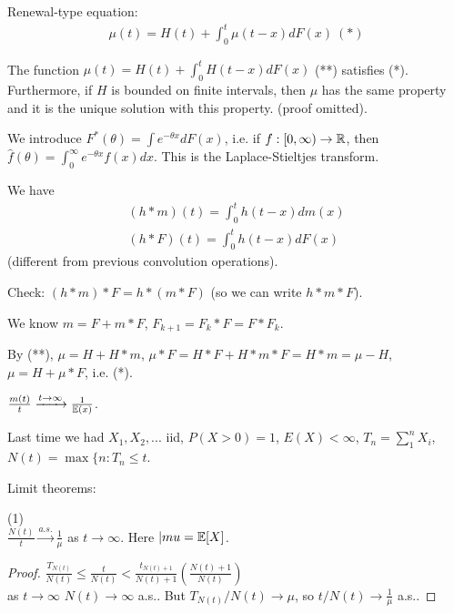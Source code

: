 \documentclass[a4paper]{article}
\begin{document}
Renewal-type equation:
\begin{equation*}
\begin{aligned}
\mu(t) = H(t) +\int_0^t \mu(t-x) dF(x) \ (*)
\end{aligned}
\end{equation*}

\begin{thm}
The function $\mu(t) = H(t) + \int_0^t H(t-x) dF(x)$ (**) satisfies (*). Furthermore, if $H$ is bounded on finite intervals, then $\mu$ has the same property and it is the unique solution with this property. (proof omitted).
\end{thm}

We introduce $F^*(\theta) = \int e^{-\theta x} dF(x)$, i.e. if $f:[0,\infty) \to \mathbb{R}$, then $\hat{f}(\theta) = \int_0^\infty e^{-\theta x} f(x) dx$. This is the Laplace-Stieltjes transform.

We have
\begin{equation*}
\begin{aligned}
(h*m) (t) = \int_0^t h(t-x) dm(x)\\
(h*F) (t) = \int_0^t h(t-x) dF(x)
\end{aligned}
\end{equation*}
(different from previous convolution operations).

Check: $(h*m)*F = h*(m*F)$ (so we can write $h*m*F$).

We know $m = F+m*F$, $F_{k+1} = F_k * F = F*F_k$.

By (**), $\mu = H+H*m$, $\mu*F = H*F + H*m*F = H*m = \mu-H$, $\mu=H+\mu*F$, i.e. (*).

\begin{thm}
$\frac{m(t)}{t} \xrightarrow{t \to \infty} \frac{1}{\mathbb{E}(x)}$.
\end{thm}

Last time we had $X_1,X_2,...$ iid, $P(X>0) = 1$, $E(X) < \infty$, $T_n = \sum_1^n X_i$, $N(t) = \max \{n:T_n \leq t$.

Limit theorems:\\
\begin{thm} (1)\\
$\frac{N(t)}{t} \xrightarrow{a.s.} \frac{1}{\mu}$ as $t \to \infty$. Here $|mu = \mathbb{E}[X]$.
\begin{proof}
$\frac{T_{N(t)}}{N(t)} \leq \frac{t}{N(t)} < \frac{t_{N(t)+1}}{N(t)+1} (\frac{N(t)+1}{N(t)})$\\
as $t \to \infty$ $N(t) \to \infty$ a.s.. But $T_{N(t)}/N(t) \to \mu$, so $t/N(t) \to \frac{1}{\mu}$ a.s..
\end{proof}
\end{thm}
\end{document}
